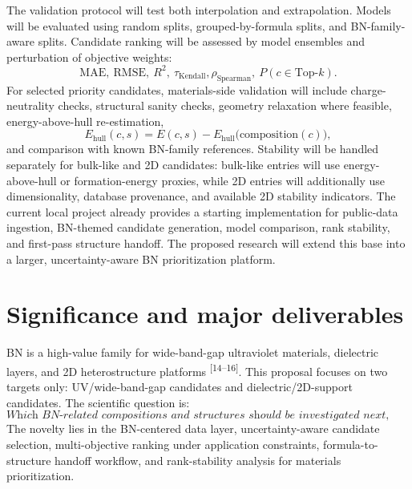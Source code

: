 \documentclass[10pt]{article}
\newcommand{\ehull}{E_{\mathrm{hull}}}
\begin{document}
The validation protocol will test both interpolation and extrapolation. Models will be evaluated using random splits, grouped-by-formula splits, and BN-family-aware splits. Candidate ranking will be assessed by model ensembles and perturbation of objective weights:
\[
  \mathrm{MAE},\ \mathrm{RMSE},\ R^2,\ \tau_{\mathrm{Kendall}},
  \rho_{\mathrm{Spearman}},\ P(c\in\mathrm{Top}\text{-}k).
\]
For selected priority candidates, materials-side validation will include charge-neutrality checks, structural sanity checks, geometry relaxation where feasible, energy-above-hull re-estimation,
\[
  \ehull(c,s)=E(c,s)-E_{\mathrm{hull}}\big(\mathrm{composition}(c)\big),
\]
and comparison with known BN-family references.
Stability will be handled separately for bulk-like and 2D candidates: bulk-like entries will use energy-above-hull or formation-energy proxies, while 2D entries will additionally use dimensionality, database provenance, and available 2D stability indicators.
The current local project already provides a starting implementation for public-data ingestion, BN-themed candidate generation, model comparison, rank stability, and first-pass structure handoff. The proposed research will extend this base into a larger, uncertainty-aware BN prioritization platform.

\section*{Significance and major deliverables}
BN is a high-value family for wide-band-gap ultraviolet materials, dielectric layers, and 2D heterostructure platforms \textsuperscript{[14--16]}. This proposal focuses on two targets only: UV/wide-band-gap candidates and dielectric/2D-support candidates. The scientific question is:
\[
  \textit{Which BN-related compositions and structures should be investigated next, and with what level of uncertainty?}
\]
The novelty lies in the BN-centered data layer, uncertainty-aware candidate selection, multi-objective ranking under application constraints, formula-to-structure handoff workflow, and rank-stability analysis for materials prioritization.
\end{document}
